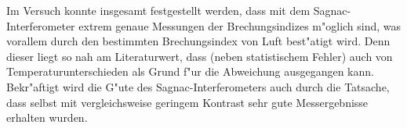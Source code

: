   Im Versuch konnte insgesamt festgestellt werden, dass mit dem Sagnac-Interferometer extrem genaue Messungen der Brechungsindizes m"oglich sind, was vorallem durch den bestimmten Brechungsindex von Luft best"atigt wird.
  Denn dieser liegt so nah am Literaturwert, dass (neben statistischem Fehler) auch von Temperaturunterschieden als Grund f"ur die Abweichung ausgegangen kann.
  Bekr"aftigt wird die G"ute des Sagnac-Interferometers auch durch die Tatsache, dass selbst mit vergleichsweise geringem Kontrast sehr gute Messergebnisse erhalten wurden.
